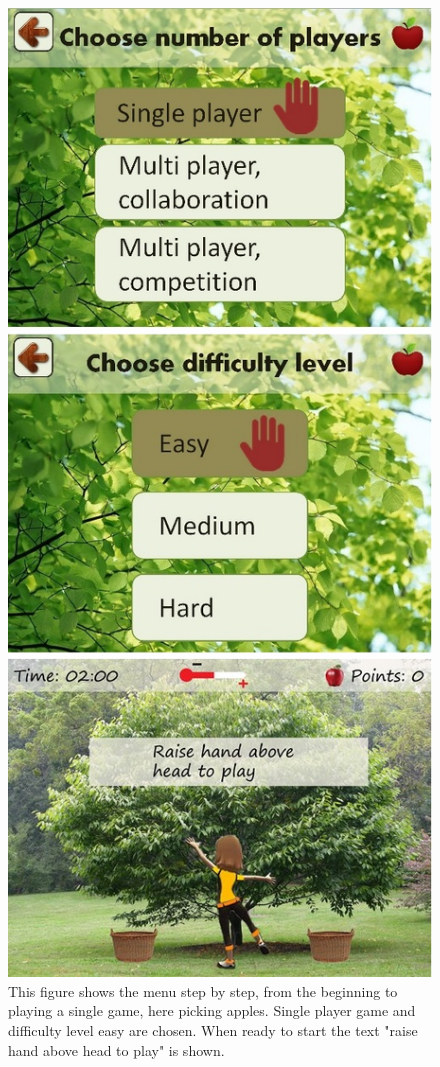 \begin{figure} [H]
\centering
\includegraphics[scale=0.45]{menuEnglishStep2.jpg}
\caption[Menu review - part two]{This figure shows the menu step by step, from the beginning to playing a single game, here picking apples. Single player game and difficulty level easy are chosen. When ready to start the text "raise hand above head to play" is shown.}
\label{menu2}
\end{figure}

